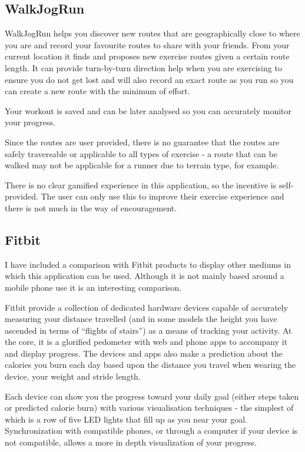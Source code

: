 \subsection{WalkJogRun}
WalkJogRun helps you discover new routes that are geographically
close to where you are and record your favourite routes to share with
your friends. From your current location it finds and
proposes new exercise routes given a certain route length. It can
provide turn-by-turn direction help when you are exercising to ensure
you do not get lost and will also record an exact route as you run so
you can create a new route with the minimum of effort. 

Your workout is saved and can be later analysed so you can accurately
monitor your progress.

Since the routes are user provided, there is no guarantee that the
routes are safely traversable or applicable to all types of exercise -
a route that can be walked may not be applicable for a runner due to
terrain type, for example. 

There is no clear gamified experience in this application, so the
incentive is self-provided. The user can only use this to improve
their exercise experience and there is not much in the way of encouragement.

\subsection{Fitbit}
I have included a comparison with Fitbit products to display other
mediums in which this application can be used. Although it is not
mainly based around a mobile phone use it is an interesting comparison.

Fitbit provide a collection of dedicated hardware devices capable of
accurately measuring your distance travelled (and in some models the
height you have ascended in terms of ``flights of stairs'') as a means
of tracking your activity. At the core, it is a glorified pedometer
with web and phone apps to accompany it and display progress. The
devices and apps also make a prediction about the calories you burn each
day based upon the distance you travel when wearing the device, your
weight and stride length. 

Each device can show you the progress toward your daily goal (either
steps taken or predicted calorie burn) with various visualisation
techniques - the simplest of which is a row of five LED lights that
fill up as you near your goal. Synchronization with compatible phones,
or through a computer if your device is not compatible, allows a more
in depth visualization of your progress.

